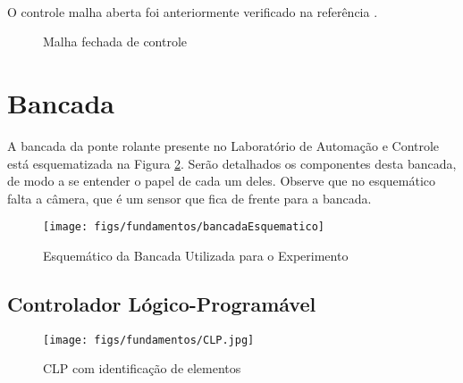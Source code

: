 \paragraph{} O controle malha aberta foi anteriormente verificado na referência \cite{redytton}.
\begin{figure}[!ht]
\centering
\caption{Malha fechada de controle\label{mfechadatikz}}
\end{figure}

\section{Bancada}
A bancada da ponte rolante presente no Laboratório de Automação e Controle está esquematizada na Figura \ref{bancadaEsquematico}. Serão detalhados os componentes desta bancada, de modo a se entender o papel de cada um deles. Observe que no esquemático falta a câmera, que é um sensor que fica de frente para a bancada. 

\begin{figure}[hbt]
\centering
  \texttt{[image: figs/fundamentos/bancadaEsquematico]}
  \caption{Esquemático da Bancada Utilizada para o Experimento \cite{redytton}\label{bancadaEsquematico}}
\end{figure}

\subsection{Controlador Lógico-Programável}
\begin{figure}[!ht]
  \centering
    \texttt{[image: figs/fundamentos/CLP.jpg]}
    \caption{CLP com identificação de elementos\label{CLPcomentado}}
\end{figure}

